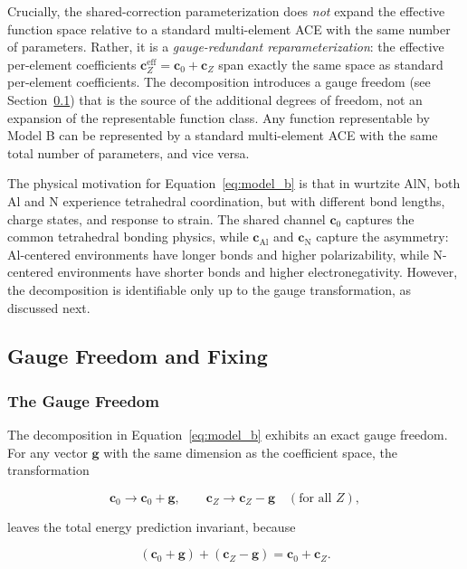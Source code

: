 \documentclass[twoside,prb,aps,floatfix,superscriptaddress,longbibliography]{revtex4-2}
\begin{document}
Crucially, the shared-correction parameterization does \emph{not} expand the effective function space relative to a standard multi-element ACE with the same number of parameters. Rather, it is a \emph{gauge-redundant reparameterization}: the effective per-element coefficients $\mathbf{c}_Z^{\mathrm{eff}} = \mathbf{c}_0 + \mathbf{c}_Z$ span exactly the same space as standard per-element coefficients. The decomposition introduces a gauge freedom (see Section~\ref{sec:gauge}) that is the source of the additional degrees of freedom, not an expansion of the representable function class. Any function representable by Model B can be represented by a standard multi-element ACE with the same total number of parameters, and vice versa.

The physical motivation for Equation~\eqref{eq:model_b} is that in wurtzite AlN, both Al and N experience tetrahedral coordination, but with different bond lengths, charge states, and response to strain. The shared channel $\mathbf{c}_0$ captures the common tetrahedral bonding physics, while $\mathbf{c}_{\mathrm{Al}}$ and $\mathbf{c}_{\mathrm{N}}$ capture the asymmetry: Al-centered environments have longer bonds and higher polarizability, while N-centered environments have shorter bonds and higher electronegativity. However, the decomposition is identifiable only up to the gauge transformation, as discussed next.

\subsection{Gauge Freedom and Fixing}
\label{sec:gauge}

\subsubsection{The Gauge Freedom}

The decomposition in Equation~\eqref{eq:model_b} exhibits an exact gauge freedom. For any vector $\mathbf{g}$ with the same dimension as the coefficient space, the transformation

\begin{equation}
\mathbf{c}_0 \to \mathbf{c}_0 + \mathbf{g},
\qquad
\mathbf{c}_Z \to \mathbf{c}_Z - \mathbf{g} \quad (\text{for all } Z),
\label{eq:gauge_transform}
\end{equation}

leaves the total energy prediction invariant, because

\begin{equation}
(\mathbf{c}_0 + \mathbf{g}) + (\mathbf{c}_Z - \mathbf{g}) = \mathbf{c}_0 + \mathbf{c}_Z.
\label{eq:gauge_invariance}
\end{equation}
\end{document}
